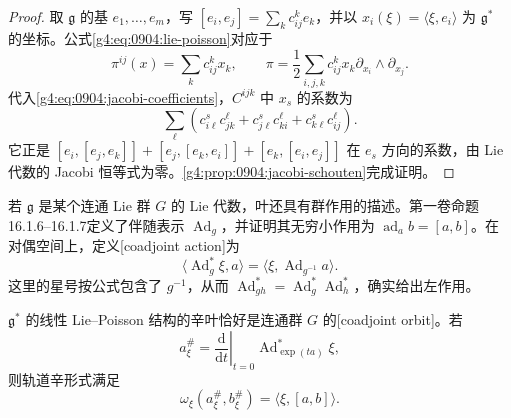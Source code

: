 \begin{proof}
	取 \(\mathfrak g\) 的基 \(e_1,\ldots,e_m\)，写 \([e_i,e_j]=\sum_k c_{ij}^{k}e_k\)，并以 \(x_i(\xi)=\langle\xi,e_i\rangle\) 为 \(\mathfrak g^*\) 的坐标。公式\eqref{g4:eq:0904:lie-poisson}对应于
	\[
		\pi^{ij}(x)=\sum_k c_{ij}^{k}x_k,
		\qquad
		\pi=\frac12\sum_{i,j,k}c_{ij}^{k}x_k\partial_{x_i}\wedge\partial_{x_j}.
	\]
	代入\eqref{g4:eq:0904:jacobi-coefficients}，\(C^{ijk}\) 中 \(x_s\) 的系数为
	\[
		\sum_\ell\left(
			c_{i\ell}^{s}c_{jk}^{\ell}
			+c_{j\ell}^{s}c_{ki}^{\ell}
			+c_{k\ell}^{s}c_{ij}^{\ell}
		\right).
	\]
	它正是 \([e_i,[e_j,e_k]]+[e_j,[e_k,e_i]]+[e_k,[e_i,e_j]]\) 在 \(e_s\) 方向的系数，由 Lie 代数的 Jacobi 恒等式为零。\cref{g4:prop:0904:jacobi-schouten}完成证明。
\end{proof}

若 \(\mathfrak g\) 是某个连通 Lie 群 \(G\) 的 Lie 代数，叶还具有群作用的描述。第一卷命题16.1.6--16.1.7定义了伴随表示 \(\operatorname{Ad}_g\)，并证明其无穷小作用为 \(\operatorname{ad}_a b=[a,b]\)。在对偶空间上，定义[coadjoint action]为
\begin{equation}\label{g4:eq:0904:coadjoint-action}
	\langle\operatorname{Ad}_g^*\xi,a\rangle
	=\langle\xi,\operatorname{Ad}_{g^{-1}}a\rangle.
\end{equation}
这里的星号按公式包含了 \(g^{-1}\)，从而 \(\operatorname{Ad}_{gh}^*=\operatorname{Ad}_g^*\operatorname{Ad}_h^*\)，确实给出左作用。

\begin{proposition}\label{g4:prop:0904:coadjoint-leaves}
	\(\mathfrak g^*\) 的线性 Lie--Poisson 结构的辛叶恰好是连通群 \(G\) 的[coadjoint orbit]。若
	\[
		a_\xi^\#=\left.\frac{\mathrm{d}}{\mathrm{d}t}\right|_{t=0}
		\operatorname{Ad}_{\exp(ta)}^*\xi,
	\]
	则轨道辛形式满足
	\begin{equation}\label{g4:eq:0904:orbit-form}
		\omega_\xi(a_\xi^\#,b_\xi^\#)=\langle\xi,[a,b]\rangle.
	\end{equation}
\end{proposition}

